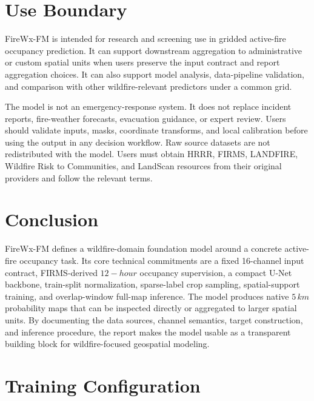 \documentclass[11pt]{article}
\newcommand{\model}{FireWx-FM}
\newcommand{\grid}{5\,km}
\newcommand{\lead}{12-hour}
\begin{document}
\section{Use Boundary}
\label{sec:use_boundary}

\model{} is intended for research and screening use in gridded active-fire occupancy prediction.
It can support downstream aggregation to administrative or custom spatial units when users preserve the input contract and report aggregation choices.
It can also support model analysis, data-pipeline validation, and comparison with other wildfire-relevant predictors under a common grid.

The model is not an emergency-response system.
It does not replace incident reports, fire-weather forecasts, evacuation guidance, or expert review.
Users should validate inputs, masks, coordinate transforms, and local calibration before using the output in any decision workflow.
Raw source datasets are not redistributed with the model.
Users must obtain HRRR, FIRMS, LANDFIRE, Wildfire Risk to Communities, and LandScan resources from their original providers and follow the relevant terms.

\section{Conclusion}

\model{} defines a wildfire-domain foundation model around a concrete active-fire occupancy task.
Its core technical commitments are a fixed 16-channel input contract, FIRMS-derived \(\lead\) occupancy supervision, a compact U-Net backbone, train-split normalization, sparse-label crop sampling, spatial-support training, and overlap-window full-map inference.
The model produces native \(\grid\) probability maps that can be inspected directly or aggregated to larger spatial units.
By documenting the data sources, channel semantics, target construction, and inference procedure, the report makes the model usable as a transparent building block for wildfire-focused geospatial modeling.




\appendix

\section{Training Configuration}
\label{app:training_config}
\end{document}
